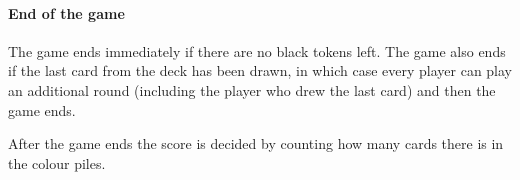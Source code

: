 \paragraph{End of the game}
The game ends immediately if there are no black tokens left. The game also ends if the last card from the deck has been drawn, in which case every player can play an additional round (including the player who drew the last card) and then the game ends.

After the game ends the score is decided by counting how many cards there is in the colour piles.




